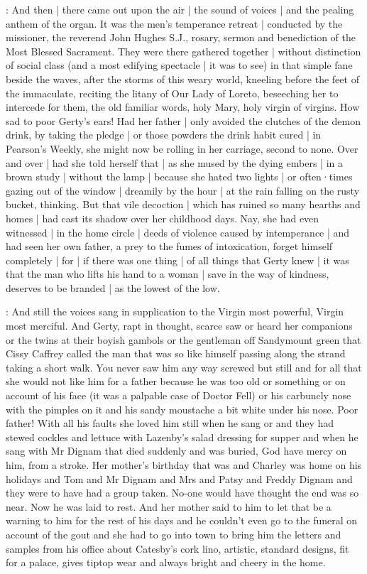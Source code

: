 :
And then |
there came out upon the air |
the sound of voices |
and the pealing anthem of the organ.
It was the men's temperance retreat |
conducted by the missioner,
the reverend John Hughes S.J.,
rosary, sermon and benediction
of the Most Blessed Sacrament.
They were there gathered together |
without distinction of social class
(and a most edifying spectacle |
it was to see)
in that simple fane beside the waves,
after the storms
of this weary world,
kneeling before the feet of the immaculate,
reciting the litany of Our Lady of Loreto,
beseeching her to intercede for them,
the old familiar words,
holy Mary,
holy virgin of virgins.
How sad to poor Gerty's ears!%
Had her father |
only avoided the clutches of the demon drink,
by taking the pledge |
or those powders the drink habit cured |
in Pearson's Weekly,
she might now be rolling in her carriage,
second to none.
Over and over |
had she told herself that |
as she mused by the dying embers |
in a brown study |
without the lamp |
because she hated two lights |
or often·times gazing out of the window |
dreamily by the hour |
at the rain falling on the rusty bucket,
thinking.
But that vile decoction |
which has ruined so many hearths and homes |
had cast its shadow over her childhood days.
Nay,
she had even witnessed |
in the home circle |
deeds of violence
caused by intemperance |
and had seen her own father,
a prey to the fumes of intoxication,
forget himself completely |%
for |
if there was one thing |
of all things
that Gerty knew |
it was
that the man who lifts his hand to a woman |
save in the way of kindness,
deserves to be branded |
as the lowest of the low.

:
And still the voices sang
in supplication to the
Virgin most powerful,
Virgin most merciful.
And Gerty,
rapt in thought,
scarce saw or heard her companions
or the twins at their boyish gambols
or the gentleman off Sandymount green
that Cissy Caffrey called
the man that was so like himself
passing along the strand taking a short walk.
You never saw him any way screwed
but still and for all that
she would not like him for a father
because he was too old or something
or on account of his face
(it was a palpable case of Doctor Fell)
or his carbuncly nose with the pimples on it
and his sandy moustache a bit white under his nose.
Poor father!
With all his faults
she loved him still when he sang
or
and they had stewed cockles
and lettuce with Lazenby's salad dressing for supper
and when he sang
 with Mr Dignam
that died suddenly and was buried,
God
have mercy on him,
from a stroke.
Her mother's birthday that was
and Charley was home on his holidays
and Tom
and Mr Dignam and Mrs
and Patsy and Freddy Dignam
and they were to have had a group taken.
No-one would have thought
the end was so near.
Now he was laid to rest.
And her mother said to him
to let that be a warning to him
for the rest of his days
and he couldn't even go to the funeral
on account of the gout
and she had to go into town
to bring him the letters and samples
from his office
about Catesby's cork lino,
artistic,
standard designs,
fit for a palace,
gives tiptop wear
and always bright and cheery in the home.

